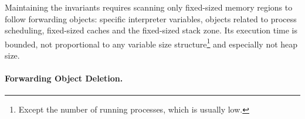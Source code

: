 \documentclass[sigplan,10pt,review,anonymous]{acmart}\settopmatter{printfolios=true,printccs=false,printacmref=false}
\newcommand{\egb}[1]{\color{blue}\fbox{\bfseries\sffamily\scriptsize Elisa:}{\sf\small$\blacktriangleright$\textit{#1}$\blacktriangleleft$}\color{black}}
\newcommand{\eem}[1]{\color{olive}\fbox{\bfseries\sffamily\scriptsize Eliot:}{\sf\small$\blacktriangleright$\textit{#1}$\blacktriangleleft$}\color{black}}
\begin{document}

Maintaining the invariants requires scanning only fixed-sized memory regions to follow forwarding objects: specific interpreter variables, objects related to process scheduling, fixed-sized caches and the fixed-sized stack zone. Its execution time is bounded, not proportional to any variable size structure\footnote{Except the number of running processes, which is usually low.} and especially not heap size.


\paragraph{Forwarding Object Deletion.}
\end{document}
